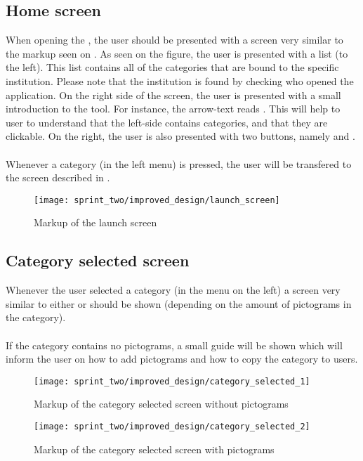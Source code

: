 
\subsection{Home screen}
\label{sec:home_screen}
When opening the \ct, the user should be presented with a screen very similar to the markup seen on . As seen on the figure, the user is presented with a list (to the left). This list contains all of the categories that are bound to the specific institution. Please note that the institution is found by checking who opened the application. On the right side of the screen, the user is presented with a small introduction to the tool. For instance, the arrow-text reads . This will help to user to understand that the left-side contains categories, and that they are clickable. On the right, the user is also presented with two buttons, namely  and .
\\\\
Whenever a category (in the left menu) is pressed, the user will be transfered to the screen described in .

\begin{figure}[!htbp]
    \centering
    \texttt{[image: sprint\_two/improved\_design/launch\_screen]}
    \caption{Markup of the launch screen}
    \label{fig:improved_design_launch_screen}
\end{figure}

\subsection{Category selected screen}
\label{sec:category_selected_screen}
Whenever the user selected a category (in the menu on the left) a screen very similar to either  or  should be shown (depending on the amount of pictograms in the category).
\\\\
If the category contains no pictograms, a small guide will be shown which will inform the user on how to add pictograms and how to copy the category to users. 
\begin{figure}[!htbp]
    \centering
    \texttt{[image: sprint\_two/improved\_design/category\_selected\_1]}
    \caption{Markup of the category selected screen without pictograms}
    \label{fig:improved_design_category_selected_1}
\end{figure}

\begin{figure}[!htbp]
    \centering
    \texttt{[image: sprint\_two/improved\_design/category\_selected\_2]}
    \caption{Markup of the category selected screen with pictograms}
    \label{fig:improved_design_category_selected_2}
\end{figure}